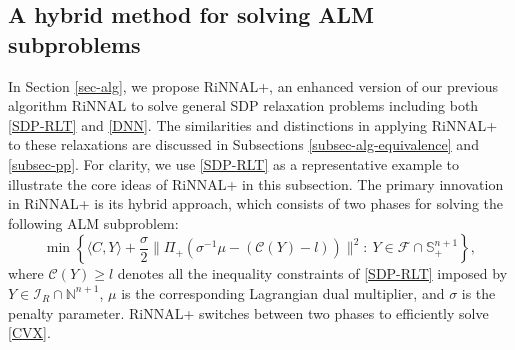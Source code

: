 \documentclass[11pt]{article}
\theoremstyle{plain}
\def\<{\big\langle}
\def\>{\big\rangle}
\def\C{\mathcal{C}}
\def\F{\mathcal{F}}
\def\I{\mathcal{I}}
\def\S{\mathbb{S}}
\begin{document}

\subsection{A hybrid method for solving ALM subproblems}

In Section \ref{sec-alg}, we propose RiNNAL+, an enhanced version of our previous algorithm RiNNAL to solve general SDP relaxation problems including both \eqref{SDP-RLT} and \eqref{DNN}. The similarities and distinctions in applying RiNNAL+ to these relaxations are discussed in Subsections \ref{subsec-alg-equivalence} and \ref{subsec-pp}. For clarity, we use \eqref{SDP-RLT} as a representative example to illustrate the core ideas of RiNNAL+ in this subsection. The primary innovation in RiNNAL+ is its hybrid approach, which consists of two phases for solving the following ALM subproblem:
\begin{equation}
    \min\left\{\<C,Y\>+\frac{\sigma}{2}\| \Pi_{+}( \sigma^{-1}\mu-(\C(Y)-l)) \|^2 :\ Y\in \F\cap \S^{n+1}_+\right\},\label{CVX}
    \tag{CVX}
\end{equation}
where $\C(Y)\geq l$ denotes all the inequality constraints of \eqref{SDP-RLT} imposed by $Y\in \I_R\cap \mathbb{N}^{n+1}$, $\mu$ is the corresponding Lagrangian 
dual multiplier, and $\sigma $ is the penalty parameter. RiNNAL+ switches between two phases to efficiently solve \eqref{CVX}.

\medskip

\end{document}
